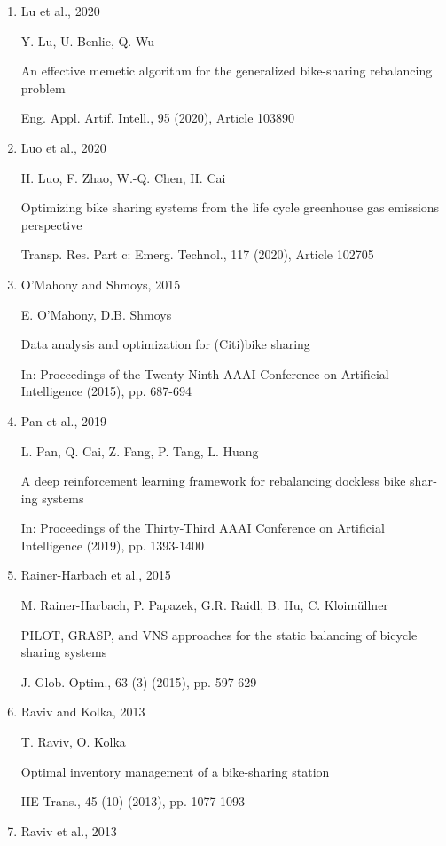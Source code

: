 \documentclass[
  english,
]{article}
\begin{document}
\begin{otherlanguage}{english}
\begin{enumerate}
  L. Lu, S. Zhao, Q.-C. He, N. Zhu

  Task assignment in predictive maintenance for free-float bicycle sharing systems

  Comput. Ind. Eng., 169 (2022), Article 108214
\item
  Lu et al., 2020

  Y. Lu, U. Benlic, Q. Wu

  An effective memetic algorithm for the generalized bike-sharing rebalancing problem

  Eng. Appl. Artif. Intell., 95 (2020), Article 103890
\item
  Luo et al., 2020

  H. Luo, F. Zhao, W.-Q. Chen, H. Cai

  Optimizing bike sharing systems from the life cycle greenhouse gas emissions perspective

  Transp. Res. Part c: Emerg. Technol., 117 (2020), Article 102705
\item
  O'Mahony and Shmoys, 2015

  E. O'Mahony, D.B. Shmoys

  Data analysis and optimization for (Citi)bike sharing

  In: Proceedings of the Twenty-Ninth AAAI Conference on Artificial Intelligence (2015), pp. 687-694
\item
  Pan et al., 2019

  L. Pan, Q. Cai, Z. Fang, P. Tang, L. Huang

  A deep reinforcement learning framework for rebalancing dockless bike sharing systems

  In: Proceedings of the Thirty-Third AAAI Conference on Artificial Intelligence (2019), pp.
  1393-1400
\item
  Rainer-Harbach et al., 2015

  M. Rainer-Harbach, P. Papazek, G.R. Raidl, B. Hu, C. Kloimüllner

  PILOT, GRASP, and VNS approaches for the static balancing of bicycle sharing systems

  J. Glob. Optim., 63 (3) (2015), pp. 597-629
\item
  Raviv and Kolka, 2013

  T. Raviv, O. Kolka

  Optimal inventory management of a bike-sharing station

  IIE Trans., 45 (10) (2013), pp. 1077-1093
\item
  Raviv et al., 2013


\end{enumerate}
\end{otherlanguage}
\end{document}

